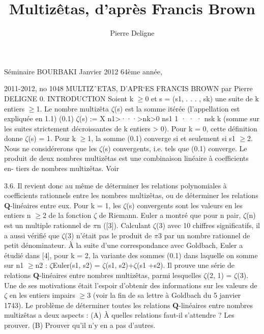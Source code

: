\documentclass[11pt]{article}
\title{Multizêtas, d’après Francis Brown}
\author{Pierre Deligne}
\date{}
\begin{document}
\maketitle
\sloppy
Séminaire BOURBAKI Janvier 2012 64ème année, 

2011-2012, no 1048 MULTIZˆETAS, D’APR`ES FRANCIS BROWN par Pierre DELIGNE 0. INTRODUCTION Soient k \(\ge\)0 et s = (s1, . . . , sk) une suite de k entiers \(\ge\)1. Le nombre multizêta \(\zeta\)(s) est la somme itérée (l’appellation est expliquée en 1.1) (0.1) \(\zeta\)(s) := X n1>···>nk>0 ns1 1 · · · nsk k (somme sur les suites strictement décroissantes de k entiers > 0). Pour k = 0, cette définition donne \(\zeta\)(s) = 1. Pour k \(\ge\)1, la somme (0.1) converge si et seulement si s1 \(\ge\)2. Nous ne considérerons que les \(\zeta\)(s) convergents, i.e. tels que (0.1) converge. Le produit de deux nombres multizêtas est une combinaison linéaire à coefficients en- tiers de nombres multizêtas. Voir 

3.6. Il revient donc au même de déterminer les relations polynomiales à coefficients rationnels entre les nombres multizêtas, ou de déterminer les relations \(\mathbf Q\)-linéaires entre eux. Pour k = 1, les \(\zeta\)(s) convergents sont les valeurs en les entiers n \(\ge\)2 de la fonction \(\zeta\) de Riemann. Euler a montré que pour n pair, \(\zeta\)(n) est un multiple rationnel de \(\pi\)n ([3]). Calculant \(\zeta\)(3) avec 10 chiffres significatifs, il a aussi vérifié que \(\zeta\)(3) n’était pas le produit de \(\pi\)3 par un nombre rationnel de petit dénominateur. À la suite d’une correspondance avec Goldbach, Euler a étudié dans [4], pour k = 2, la variante des sommes (0.1) dans laquelle on somme sur n1 \(\ge\)n2 : \(\zeta\)Euler(s1, s2) = \(\zeta\)(s1, s2)+\(\zeta\)(s1 +s2). Il prouve une série de relations \(\mathbf Q\)-linéaires entre nombres multizêtas, parmi lesquelles \(\zeta\)(2, 1) = \(\zeta\)(3). Une de ses motivations était l’espoir d’obtenir des informations sur les valeurs de \(\zeta\) en les entiers impairs \(\ge\)3 (voir la fin de sa lettre à Goldbach du 5 janvier 1743). Le problème de déterminer toutes les relations \(\mathbf Q\)-linéaires entre nombres multizêtas a deux aspects : (A) À quelles relations faut-il s’attendre ? Les prouver. (B) Prouver qu’il n’y en a pas d’autres.
\end{document}
